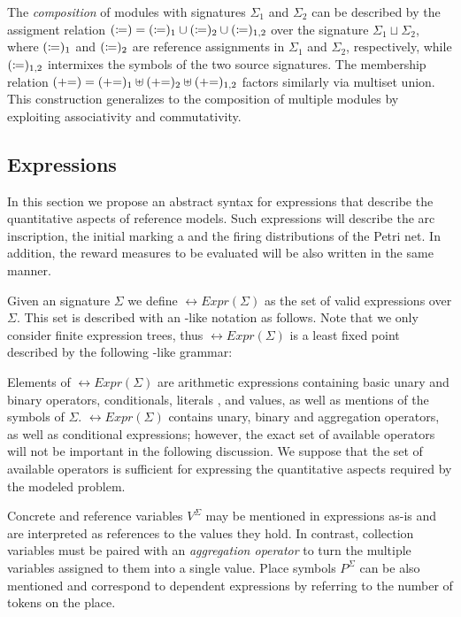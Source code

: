 The \emph{composition} of  modules with signatures \(\Sigma_1\) and \(\Sigma_2\) can be described by the assigment relation \((\coloneq) = (\coloneq)_1 \cup (\coloneq)_2 \cup (\coloneq)_{1,2}\) over the signature \(\Sigma_1 \sqcup \Sigma_2\), where \((\coloneq)_1\) and \((\coloneq)_2\) are reference assignments in \(\Sigma_1\) and \(\Sigma_2\), respectively, while \((\coloneq)_{1,2}\) intermixes the symbols of the two source signatures. The membership relation \((\mathrel{{+}{=}}) = (\mathrel{{+}{=}})_1 \uplus (\mathrel{{+}{=}})_2 \uplus (\mathrel{{+}{=}})_{1,2}\) factors similarly via multiset union. This construction generalizes to the composition of multiple modules by exploiting associativity and commutativity.

\subsection{Expressions}

In this section we propose an abstract syntax for expressions that describe the quantitative aspects of reference  models. Such expressions will describe the arc inscription, the initial marking a and the firing distributions of the Petri net. In addition, the reward measures to be evaluated will be also written in the same manner.

Given an  signature \(\Sigma\) we define \(\rel{Expr}(\Sigma)\) as the set of valid expressions over \(\Sigma\). This set is described with an -like notation as follows. Note that we only consider finite expression trees, thus \(\rel{Expr}(\Sigma)\) is a least fixed point described by the following -like grammar:

Elements of \(\rel{Expr}(\Sigma)\) are arithmetic expressions containing basic unary and binary operators, conditionals, literals ,  and  values, as well as mentions of the symbols of \(\Sigma\). \(\rel{Expr}(\Sigma)\) contains unary, binary and aggregation operators, as well as conditional expressions; however, the exact set of available operators will not be important in the following discussion. We suppose that the set of available operators is sufficient for expressing the quantitative aspects required by the modeled problem.

Concrete and reference variables \(V^\Sigma\) may be mentioned in expressions as-is and are interpreted as references to the values they hold. In contrast, collection variables must be paired with an \emph{aggregation operator} to turn the multiple variables assigned to them into a single value. Place symbols \(P^\Sigma\) can be also mentioned and correspond to  dependent expressions by referring to the number of tokens on the place.

